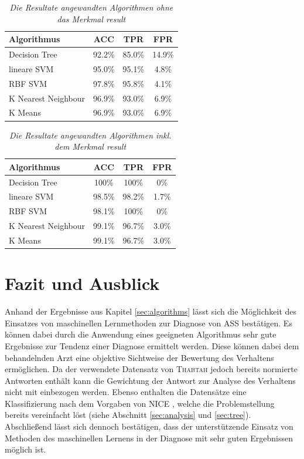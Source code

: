 \documentclass[conference]{IEEEtran}
\begin{document}
\begin{table}[htbp]
\begin{tabular}{l c c c}
\textbf{Algorithmus} & \textbf{ACC} & \textbf{TPR} & \textbf{FPR} \\ \hline
Decision Tree & 92.2\% & 85.0\% & 14.9\% \\
lineare SVM & 95.0\% & 95.1\% & 4.8\% \\
RBF SVM & 97.8\% & 95.8\% & 4.1\% \\
K Nearest Neighbour & 96.9\% & 93.0\% & 6.9\%\\ 
K Means & 96.9\% & 93.0\% & 6.9\%\\ 
\end{tabular}
\centering
\label{tbl:results_table_without}
\caption{\em Die Resultate angewandten Algorithmen ohne das Merkmal \glqq result\grqq}
\end{table}

\begin{table}[htbp]
\begin{tabular}{l c c c}
\textbf{Algorithmus} & \textbf{ACC} & \textbf{TPR} & \textbf{FPR} \\ \hline
Decision Tree & 100\% & 100\% & 0\% \\
lineare SVM & 98.5\% & 98.2\% & 1.7\% \\
RBF SVM & 98.1\% & 100\% & 0\% \\
K Nearest Neighbour & 99.1\% & 96.7\% & 3.0\%\\ 
K Means & 99.1\% & 96.7\% & 3.0\%\\ 
\end{tabular}
\centering
\label{tbl:results_table}
\caption{\em Die Resultate angewandten Algorithmen inkl. dem Merkmal \glqq result\grqq}
\end{table}


\section{Fazit und Ausblick}
Anhand der Ergebnisse aus Kapitel \ref{sec:algorithms} lässt sich die Möglichkeit des Einsatzes von maschinellen Lernmethoden zur Diagnose von ASS bestätigen. Es können dabei durch die Anwendung eines geeigneten Algorithmus sehr gute Ergebnisse zur Tendenz einer Diagnose ermittelt werden. Diese können dabei dem behandelnden Arzt eine objektive Sichtweise der Bewertung des Verhaltens ermöglichen. Da der verwendete Datensatz von \textsc{Thabtah} \cite{Thabtah2017, Thabtah, Thabtah2018} jedoch bereits normierte Antworten enthält kann die Gewichtung der Antwort zur Analyse des Verhaltens nicht mit einbezogen werden. Ebenso enthalten die Datensätze eine Klassifizierung nach dem Vorgaben von \textsc{NICE} \cite{NICE2012}, welche die Problemstellung bereits vereinfacht löst (siehe Abschnitt \ref{sec:analysis} und \ref{sec:tree}). Abschließend lässt sich dennoch bestätigen, dass der unterstützende Einsatz von Methoden des maschinellen Lernens in der Diagnose mit sehr guten Ergebnissen möglich ist.

\printbibliography
\end{document}
